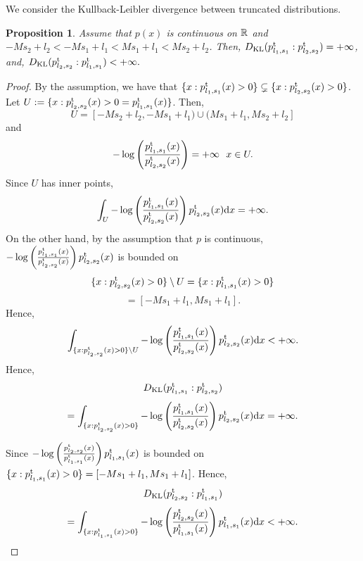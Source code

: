 \documentclass[journal]{IEEEtran}
\newtheorem{proposition}[theorem]{Proposition}
\begin{document}
We consider the Kullback-Leibler divergence between truncated distributions.   
\begin{proposition}\label{proposition:KLD-truncated}
Assume that $p(x)$ is continuous on ${\mathbb{R}}$ and 
$-M s_2 + l_2 < -M s_1 + l_1 < M s_1 + l_1 < M s_2 + l_2$.
Then, 
$D_{\textup{KL}}(p^{\textup{t}}_{l_1,s_1}: p^{\textup{t}}_{l_2,s_2}) = +\infty$,  
and, 
$D_{\textup{KL}}(p^{\textup{t}}_{l_2,s_2}: p^{\textup{t}}_{l_1,s_1}) < +\infty.$
\end{proposition}

\begin{proof}
By the assumption, we have that 
$\{x : p^{\textup{t}}_{l_1, s_1}(x) > 0\} \subsetneq  \{x : p^{\textup{t}}_{l_2, s_2}(x) > 0\}$.  
Let  $U := \{x : p^{\textup{t}}_{l_2, s_2}(x) > 0 = p^{\textup{t}}_{l_1, s_1}(x) \}$. 
Then, 
\[ U = [-M s_2 + l_2, -M s_1 + l_1) \cup (M s_1 + l_1, M s_2 + l_2] \]
and  
\[ -\log \left(\frac{p^{\textup{t}}_{l_1, s_1}(x)}{p^{\textup{t}}_{l_2, s_2}(x)} \right) = +\infty \ \ x \in U. \]
Since $U$ has inner points, 
\[ \int_U -\log \left(\frac{p^{\textup{t}}_{l_1, s_1}(x)}{p^{\textup{t}}_{l_2, s_2}(x)} \right) p^{\textup{t}}_{l_2, s_2}(x) \mathrm{d}x = +\infty. \]
On the other hand, by the assumption that $p$ is continuous, 
$-\log \left(\frac{p^{\textup{t}}_{l_1, s_1}(x)}{p^{\textup{t}}_{l_2, s_2}(x)} \right) p^{\textup{t}}_{l_2, s_2}(x)$ is bounded on 
\[  \{x : p^{\textup{t}}_{l_2, s_2}(x) > 0\} \setminus U = \{x : p^{\textup{t}}_{l_1, s_1}(x) > 0\} \]
\[= [-M s_1 + l_1, M s_1 + l_1]. \]
Hence, 
\[ \int_{\{x : p^{\textup{t}}_{l_2, s_2}(x) > 0\} \setminus U}  -\log \left(\frac{p^{\textup{t}}_{l_1, s_1}(x)}{p^{\textup{t}}_{l_2, s_2}(x)}\right) p^{\textup{t}}_{l_2, s_2}(x) \mathrm{d}x < +\infty. \]
Hence, 
\[ D_{\textup{KL}}(p^{\textup{t}}_{l_1,s_1}: p^{\textup{t}}_{l_2,s_2}) \]
\[= \int_{\{x : p^{\textup{t}}_{l_2, s_2}(x) > 0\}}  -\log \left(\frac{p^{\textup{t}}_{l_1, s_1}(x)}{p^{\textup{t}}_{l_2, s_2}(x)}\right) p^{\textup{t}}_{l_2, s_2}(x) \mathrm{d}x = +\infty. \]

Since $-\log \left(\frac{p^{\textup{t}}_{l_2, s_2}(x)}{p^{\textup{t}}_{l_1, s_1}(x)} \right) p^{\textup{t}}_{l_1, s_1}(x)$ is bounded on 
$\{x : p^{\textup{t}}_{l_1, s_1}(x) > 0\} = [-M s_1 + l_1, M s_1 + l_1]$.
Hence, 
\[ D_{\textup{KL}}(p^{\textup{t}}_{l_2,s_2}: p^{\textup{t}}_{l_1,s_1}) \]
\[= \int_{\{x : p^{\textup{t}}_{l_1, s_1}(x) > 0\}}  -\log \left(\frac{p^{\textup{t}}_{l_2, s_2}(x)}{p^{\textup{t}}_{l_1, s_1}(x)}\right) p^{\textup{t}}_{l_1, s_1}(x) \mathrm{d}x < +\infty. \]
\end{proof}
\end{document}
